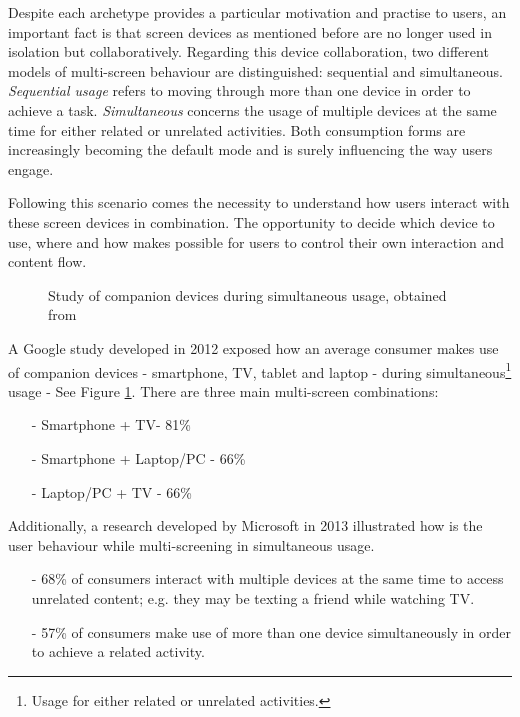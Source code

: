 \documentclass{acm_proc_article-sp}
\begin{document}
Despite each archetype provides a particular motivation and practise to users, an important fact is that screen devices as mentioned before are no longer used in isolation but collaboratively. Regarding this device collaboration, two different models of multi-screen\cite{multiscreen:google} behaviour are distinguished:  sequential and simultaneous. \textit{Sequential usage} refers to moving through more than one device in order to achieve a task. \textit{Simultaneous} concerns the usage of multiple devices at the same time for either related or unrelated activities. Both consumption forms are increasingly becoming the default mode and is surely influencing the way users engage. 

Following this scenario comes the necessity to understand how users interact with these screen devices in combination\cite{hritzuk2014multiscreen}. The opportunity to decide which device to use, where and how makes possible for users to control their own interaction and content flow. 

\begin{figure}[!htb]
	\centering
	\caption{Study of companion devices during simultaneous	 usage, obtained from \cite{multiscreen:google}}
	\label{fig:simultaneous}
\end{figure}

A Google study developed in 2012 \cite{multiscreen:google} exposed how an average consumer makes use of companion devices - smartphone, TV, tablet and laptop - during simultaneous\footnote{Usage for either related or unrelated activities.} usage - See Figure \ref{fig:simultaneous}. There are three main multi-screen combinations:
\begin{itemize}
  \item[-] Smartphone + TV\hspace{1.35cm}- 81\% 
  \item[-] Smartphone + Laptop/PC \hspace{0.1cm}- 66\% 
  \item[-] Laptop/PC  + TV\hspace{1.35cm} - 66\% 
\end{itemize}

Additionally, a research developed by Microsoft in 2013 \cite{microsoftcross} illustrated how is the user behaviour while multi-screening in simultaneous usage.  

\begin{itemize}
  \item[-] 68\% of consumers interact with multiple devices at the same time to access unrelated content; e.g. they may be texting a friend while watching TV. 
  \item[-] 57\% of consumers make use of more than one device simultaneously in order to achieve a related activity. 
\end{itemize}
\end{document}
